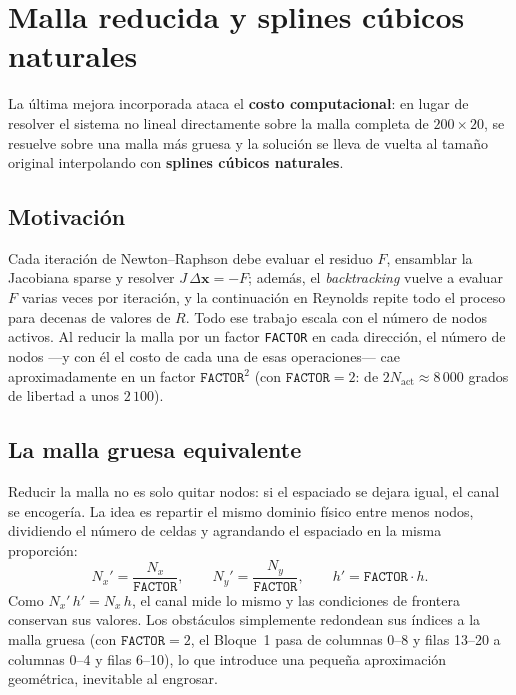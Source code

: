 \documentclass[12pt, a4paper]{article}
\begin{document}
\section{Malla reducida y splines cúbicos naturales}
\label{sec:spline}

La última mejora incorporada ataca el \textbf{costo computacional}: en lugar
de resolver el sistema no lineal directamente sobre la malla completa de
$200\times20$, se resuelve sobre una malla más gruesa y la solución se lleva
de vuelta al tamaño original interpolando con \textbf{splines cúbicos
naturales}.

\subsection{Motivación}

Cada iteración de Newton--Raphson debe evaluar el residuo $F$, ensamblar la
Jacobiana sparse y resolver $J\,\Delta\mathbf{x} = -F$; además, el
\emph{backtracking} vuelve a evaluar $F$ varias veces por iteración, y la
continuación en Reynolds repite todo el proceso para decenas de valores de
$R$. Todo ese trabajo escala con el número de nodos activos. Al reducir la
malla por un factor \texttt{FACTOR} en cada dirección, el número de nodos
—y con él el costo de cada una de esas operaciones— cae aproximadamente en
un factor $\texttt{FACTOR}^{2}$ (con $\texttt{FACTOR}=2$: de $2N_{\text{act}}
\approx 8\,000$ grados de libertad a unos $2\,100$).

\subsection{La malla gruesa equivalente}

Reducir la malla no es solo quitar nodos: si el espaciado se dejara igual,
el canal se encogería. La idea es repartir el mismo dominio físico entre
menos nodos, dividiendo el número de celdas y agrandando el espaciado en la
misma proporción:
\begin{equation}
  N_x' = \frac{N_x}{\texttt{FACTOR}}, \qquad
  N_y' = \frac{N_y}{\texttt{FACTOR}}, \qquad
  h' = \texttt{FACTOR}\cdot h.
\end{equation}
Como $N_x'\,h' = N_x\,h$, el canal mide lo mismo y las condiciones de
frontera conservan sus valores. Los obstáculos simplemente redondean sus
índices a la malla gruesa (con $\texttt{FACTOR}=2$, el Bloque~1 pasa de
columnas 0--8 y filas 13--20 a columnas 0--4 y filas 6--10), lo que
introduce una pequeña aproximación geométrica, inevitable al engrosar.
\end{document}
